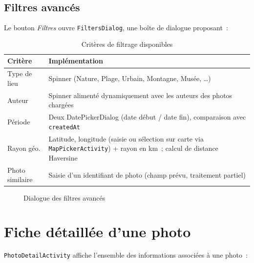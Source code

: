 \documentclass[12pt, a4paper]{report}
\begin{document}
\subsection{Filtres avancés}

Le bouton \emph{Filtres} ouvre \texttt{FiltersDialog}, une boîte de dialogue proposant~:

\begin{table}[H]
\centering
\caption{Critères de filtrage disponibles}
\begin{tabularx}{\textwidth}{lX}
\toprule
\rowcolor{primary!15}
\textbf{Critère} & \textbf{Implémentation} \\
\midrule
Type de lieu    & Spinner (Nature, Plage, Urbain, Montagne, Musée, \ldots) \\
Auteur          & Spinner alimenté dynamiquement avec les auteurs des photos chargées \\
Période         & Deux DatePickerDialog (date début / date fin), comparaison avec \texttt{createdAt} \\
Rayon géo.      & Latitude, longitude (saisie ou sélection sur carte via \texttt{MapPickerActivity}) + rayon en km~; calcul de distance Haversine \\
Photo similaire & Saisie d'un identifiant de photo (champ prévu, traitement partiel) \\
\bottomrule
\end{tabularx}
\end{table}

\begin{figure}[H]
  \centering
  \caption{Dialogue des filtres avancés}
  \label{fig:filters}
\end{figure}

\section{Fiche détaillée d'une photo}

\texttt{PhotoDetailActivity} affiche l'ensemble des informations associées à une photo~:
\end{document}
